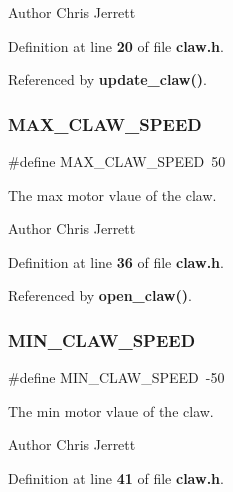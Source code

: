 \begin{DoxyAuthor}{Author}
Chris Jerrett 
\end{DoxyAuthor}


Definition at line \textbf{ 20} of file \textbf{ claw.\+h}.



Referenced by \textbf{ update\+\_\+claw()}.

\mbox{\label{claw_8h_ae3be50b28977dac719f086e131ba8fd7}} 
\subsubsection{M\+A\+X\+\_\+\+C\+L\+A\+W\+\_\+\+S\+P\+E\+ED}
{\footnotesize\ttfamily \#define M\+A\+X\+\_\+\+C\+L\+A\+W\+\_\+\+S\+P\+E\+ED~50}



The max motor vlaue of the claw. 

\begin{DoxyAuthor}{Author}
Chris Jerrett 
\end{DoxyAuthor}


Definition at line \textbf{ 36} of file \textbf{ claw.\+h}.



Referenced by \textbf{ open\+\_\+claw()}.

\mbox{\label{claw_8h_a7306e61a4209c74862aa81d7b3de74e5}} 
\subsubsection{M\+I\+N\+\_\+\+C\+L\+A\+W\+\_\+\+S\+P\+E\+ED}
{\footnotesize\ttfamily \#define M\+I\+N\+\_\+\+C\+L\+A\+W\+\_\+\+S\+P\+E\+ED~-\/50}



The min motor vlaue of the claw. 

\begin{DoxyAuthor}{Author}
Chris Jerrett 
\end{DoxyAuthor}


Definition at line \textbf{ 41} of file \textbf{ claw.\+h}.



